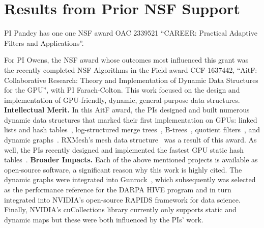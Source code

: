 
\section{Results from Prior NSF Support}

PI Pandey has one one NSF award OAC 2339521 ``CAREER: Practical Adaptive Filters and Applications''.

For PI Owens, the NSF award whose outcomes most influenced this grant was the recently completed NSF Algorithms in the Field award CCF-1637442, ``AitF\@: Collaborative Research: Theory and Implementation of Dynamic Data Structures for the GPU'', with PI Farach-Colton. This work focused on the design and implementation of GPU-friendly, dynamic, general-purpose data structures.
\textbf{Intellectual Merit.} In this AitF award, the PIs designed and built numerous dynamic data structures that marked their first implementation on GPUs: linked lists and hash tables~\cite{Ashkiani:2018:ADH}, log-structured merge trees~\cite{Ashkiani:2018:GLA}, B-trees~\cite{Awad:2019:EAH}, quotient filters~\cite{GeilFO18}, and dynamic graphs~\cite{Awad:2020:DGO}. RXMesh's mesh data structure~\cite{Mahmoud:2021:RAG} was a result of this award. As well, the PIs recently designed and implemented the fastest GPU static hash tables~\cite{Awad:2023:AAI}.
%
\textbf{Broader Impacts.} Each of the above mentioned projects is available as open-source software, a significant reason why this work is highly cited. The dynamic graphs were integrated into Gunrock~\cite{Awad:2020:DGO,Wang:2017:GGG}, which subsequently was selected as the performance reference for the DARPA HIVE program and in turn integrated into NVIDIA's open-source RAPIDS framework for data science. Finally, NVIDIA's cuCollections library currently only supports static and dynamic maps but these were both influenced by the PIs' work.

